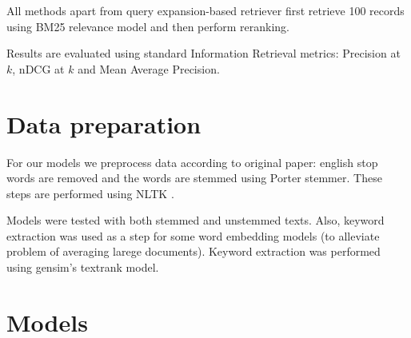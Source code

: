 \documentclass{article}
\begin{document}
All methods apart from query expansion-based retriever first retrieve 100 records using BM25 relevance model and then perform reranking.

Results are evaluated using standard Information Retrieval metrics: Precision at $k$, nDCG at $k$ and Mean Average Precision.

\section{Data preparation} 
For our models we preprocess data according to original paper: english stop words are removed and the words are stemmed using Porter stemmer. These steps are performed using NLTK \citep{Loper02nltk:the}.

Models were tested with both stemmed and unstemmed texts. Also, keyword extraction was used as a step for some word embedding models (to alleviate problem of averaging larege documents). Keyword extraction was performed using gensim's \citep{rehurek_lrec} textrank model.

\section{Models}
\end{document}
